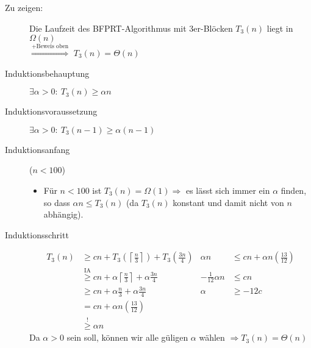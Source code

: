 \documentclass[a4paper,10pt]{scrartcl}
\begin{document}
\begin{description}
\item[Zu zeigen:] Die Laufzeit des BFPRT-Algorithmus mit 3er-Blöcken $T_3(n)$ liegt in $\Omega(n)$\\
    $\overset{+ \text{Beweis oben}}{\Rightarrow}$ $T_3(n) = \Theta(n)$
\item[Induktionsbehauptung] $\exists\alpha > 0{:}\ T_3(n) \geq \alpha n$
\item[Induktionsvoraussetzung] $\exists\alpha > 0{:}\ T_3(n-1) \geq \alpha (n-1)$
\item[Induktionsanfang] ($n < 100$)
    \begin{itemize}
     \item Für $n < 100$ ist $T_3(n) = \Omega(1) \Rightarrow$ es lässt sich immer ein $\alpha$ finden, so dass $\alpha n \leq T_3(n)$ (da $T_3(n)$ konstant und damit nicht von $n$ abhängig).
    \end{itemize}
\item[Induktionsschritt]
\[
\begin{array}{rl|rl}
 T_3(n) &\geq cn + T_3\left(\left\lceil\frac{n}{3}\right\rceil\right) + T_3\left(\frac{3n}{4}\right) &
            \alpha n &\leq cn + \alpha n \left(\frac{13}{12}\right) \\
        &\overset{\text{IA}}{\geq} cn + \alpha \left\lceil\frac{n}{3}\right\rceil + \alpha \frac{3n}{4} &
            - \frac{1}{12} \alpha n &\leq cn \\
        &\geq cn + \alpha \frac{n}{3} + \alpha \frac{3n}{4} &
            \alpha &\geq -12 c \\
        &= cn + \alpha n \left(\frac{13}{12}\right) \\
        &\overset{!}{\geq} \alpha n
\end{array}
\]
Da $\alpha > 0$ sein soll, können wir alle güligen $\alpha$ wählen $\Rightarrow T_3(n) = \Theta(n)$ 
\end{description}
\end{document}
